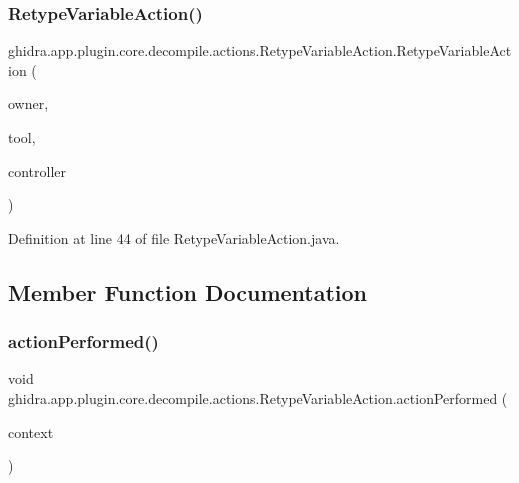\subsubsection{\texorpdfstring{RetypeVariableAction()}{RetypeVariableAction()}}
{\footnotesize\ttfamily ghidra.\+app.\+plugin.\+core.\+decompile.\+actions.\+Retype\+Variable\+Action.\+Retype\+Variable\+Action (\begin{DoxyParamCaption}\item[{String}]{owner,  }\item[{Plugin\+Tool}]{tool,  }\item[{\mbox{\hyperlink{classghidra_1_1app_1_1decompiler_1_1component_1_1_decompiler_controller}{Decompiler\+Controller}}}]{controller }\end{DoxyParamCaption})\hspace{0.3cm}{\ttfamily [inline]}}



Definition at line 44 of file Retype\+Variable\+Action.\+java.



\subsection{Member Function Documentation}
\mbox{\label{classghidra_1_1app_1_1plugin_1_1core_1_1decompile_1_1actions_1_1_retype_variable_action_a32493365e12a8b6545b765e7718cd6ea}} 
\subsubsection{\texorpdfstring{actionPerformed()}{actionPerformed()}}
{\footnotesize\ttfamily void ghidra.\+app.\+plugin.\+core.\+decompile.\+actions.\+Retype\+Variable\+Action.\+action\+Performed (\begin{DoxyParamCaption}\item[{Action\+Context}]{context }\end{DoxyParamCaption})\hspace{0.3cm}{\ttfamily [inline]}}



